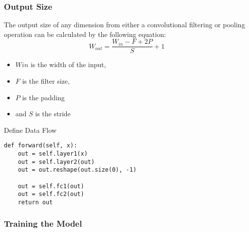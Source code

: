 \documentclass[14 pt]{beamer}
\let\olditem\item
\renewcommand{\item}{\olditem\vspace{4pt}}
\begin{document}
\begin{frame}
  \frametitle{Output Size}
  The output size of any dimension from either a convolutional filtering or
  pooling operation can be calculated by the following equation:
  \begin{displaymath}
    W_{out} = \frac{W_{in}-F+2P}{S} + 1
  \end{displaymath}
  \begin{itemize}
  \item   $W{in}$ is the width of the input, 
  \item $F$ is the filter size, 
  \item $P$ is the padding
\item and $S$ is the stride
\end{itemize}
\end{frame}

\begin{frame}[fragile]
  \begin{block}{Define Data Flow}
\begin{verbatim}
def forward(self, x):
    out = self.layer1(x)
    out = self.layer2(out)
    out = out.reshape(out.size(0), -1)

    out = self.fc1(out)
    out = self.fc2(out)
    return out
\end{verbatim}
  \end{block}
\end{frame}

\begin{frame}
  \frametitle{Training the Model}
  
\end{frame}
\end{document}
